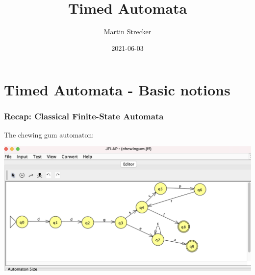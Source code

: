 \documentclass{beamer}
\title{Timed Automata}
\author{Martin Strecker}
\date{2021-06-03}
\begin{document}

\begin{frame}
  \titlepage
\end{frame}



\section{Timed Automata - Basic notions}



\begin{frame}[fragile]\frametitle{Recap: Classical Finite-State Automata}
  
The chewing gum automaton:

  \begin{center}
    \includegraphics[scale=0.4]{Figures/chewing_gum_automaton.png}
  \end{center}

\end{frame}
\end{document}
